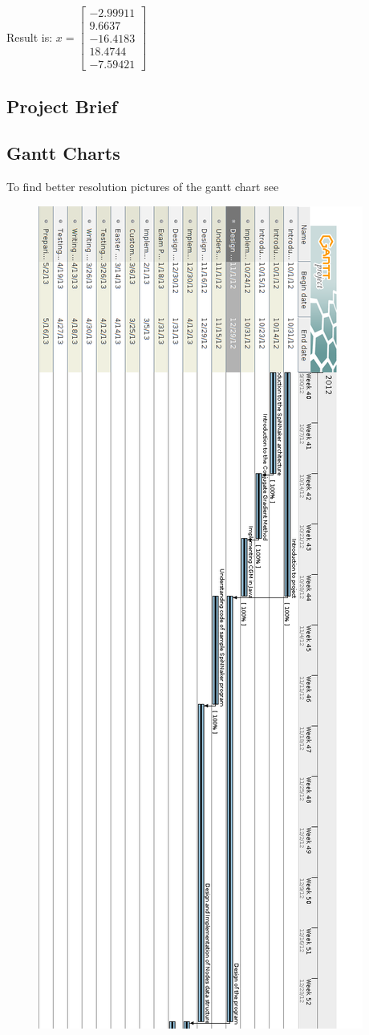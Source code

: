 \documentclass[12pt,a4paper]{article}
\begin{document}
Result is:
$x=\begin{bmatrix}
-2.99911\\
9.6637\\
-16.4183\\
18.4744\\
-7.59421
\end{bmatrix}$

\subsection{Project Brief}
\newpage
\subsection{Gantt Charts}
To find better resolution pictures of the gantt chart see \cite{git_repo}
\topmargin=0pt
\voffset=0pt
\begin{figure}[h!]
\includegraphics[scale=0.4]{Gantt_Charts/Final_Gantt1.png}

\end{figure}
\end{document}
